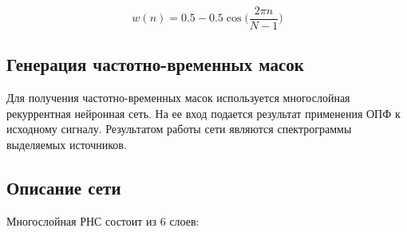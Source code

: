 \begin{equation}
w(n) = 0.5 - 0.5 \cos \Big(\frac{2\pi n}{N-1}\Big)
\end{equation}

\subsection{Генерация частотно-временных масок}

Для получения частотно-временных масок используется многослойная рекуррентная нейронная сеть. На ее вход подается результат применения ОПФ к исходному сигналу. Результатом работы сети являются спектрограммы выделяемых источников.

\subsection{Описание сети}
Многослойная РНС состоит из 6 слоев:

